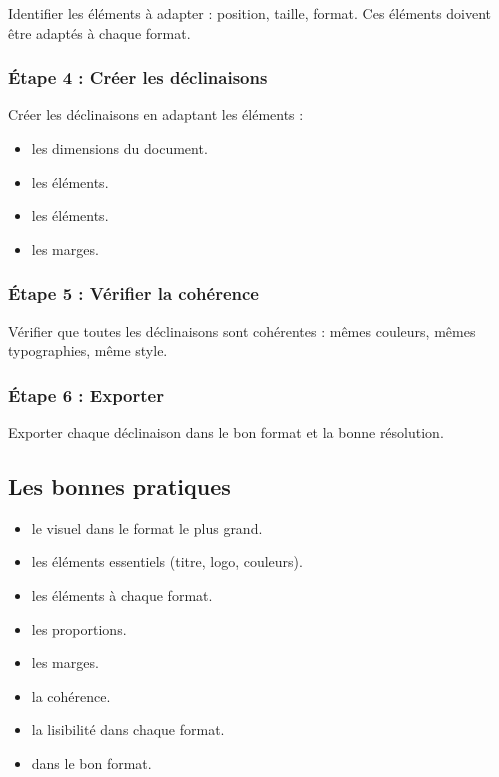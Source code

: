 Identifier les éléments à adapter : position, taille, format. Ces éléments doivent être adaptés à chaque format.

\subsubsection{Étape 4 : Créer les déclinaisons}

Créer les déclinaisons en adaptant les éléments :

\begin{itemize}
    \item {} les dimensions du document.
    \item {} les éléments.
    \item {} les éléments.
    \item {} les marges.
\end{itemize}

\subsubsection{Étape 5 : Vérifier la cohérence}

Vérifier que toutes les déclinaisons sont cohérentes : mêmes couleurs, mêmes typographies, même style.

\subsubsection{Étape 6 : Exporter}

Exporter chaque déclinaison dans le bon format et la bonne résolution.

\subsection{Les bonnes pratiques}

\begin{itemize}
    \item {} le visuel dans le format le plus grand.
    \item {} les éléments essentiels (titre, logo, couleurs).
    \item {} les éléments à chaque format.
    \item {} les proportions.
    \item {} les marges.
    \item {} la cohérence.
    \item {} la lisibilité dans chaque format.
    \item {} dans le bon format.
\end{itemize}

